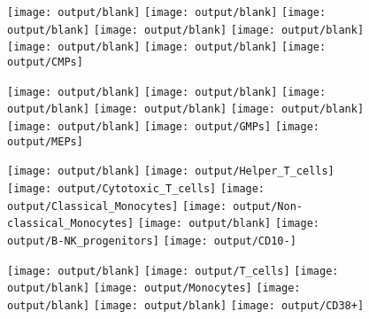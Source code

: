 \documentclass[11pt]{article}
\begin{document}
\begin{figure}[htbp]
  \centering
  \begin{minipage}[t]{0.125\textwidth}
    \texttt{[image: output/blank]}
    \texttt{[image: output/blank]}
    \texttt{[image: output/blank]}
    \texttt{[image: output/blank]}
    \texttt{[image: output/blank]}
    \texttt{[image: output/blank]}
    \texttt{[image: output/blank]}
    \texttt{[image: output/CMPs]}
  \end{minipage}%
  \begin{minipage}[t]{0.125\textwidth}
    \vspace{-0.5\linewidth} %
    \texttt{[image: output/blank]}
    \texttt{[image: output/blank]}
    \texttt{[image: output/blank]}
    \texttt{[image: output/blank]}
    \texttt{[image: output/blank]}
    \texttt{[image: output/blank]}
    \texttt{[image: output/GMPs]}
    \texttt{[image: output/MEPs]}
  \end{minipage}%
  \begin{minipage}[t]{0.125\textwidth}
    \centering
    \texttt{[image: output/blank]}
    \texttt{[image: output/Helper\_T\_cells]}
    \texttt{[image: output/Cytotoxic\_T\_cells]}
    \texttt{[image: output/Classical\_Monocytes]}
    \texttt{[image: output/Non-classical\_Monocytes]}
    \texttt{[image: output/blank]}
    \texttt{[image: output/B-NK\_progenitors]}
    \texttt{[image: output/CD10-]}
  \end{minipage}%
  \begin{minipage}[t]{0.125\textwidth}
    \centering
    \vspace{-0.5\linewidth} %
    \texttt{[image: output/blank]}
    \texttt{[image: output/T\_cells]}
    \texttt{[image: output/blank]}
    \texttt{[image: output/Monocytes]}
    \texttt{[image: output/blank]}
    \texttt{[image: output/blank]}
    \texttt{[image: output/CD38+]}
  \end{minipage}%
  \begin{minipage}[t]{0.125\textwidth}

\end{minipage}
\end{figure}
\end{document}
